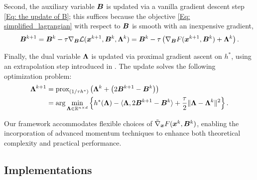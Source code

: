Second, the auxiliary variable $\bm{B}$ is updated via a vanilla gradient descent step \eqref{Eq: the update of B}; this suffices because the objective \eqref{Eq: simplified_lagrangian} with respect to $\bm{B}$ is smooth with an inexpensive gradient, 
\begin{align}
   \bm{B}^{k+1} = \bm{B}^k - \tau \nabla_{\bm{B}}\mathcal{L}(\bm{x}^{k+1}, \bm{B}^k, \bm{\Lambda}^k) = \bm{B}^k - \tau \left( \nabla_{\bm{B}} F(\bm{x}^{k+1}, \bm{B}^k) + \bm{\Lambda}^k \right). \label{Eq: the update of B}
\end{align}

Finally, the dual variable $\bm{\Lambda}$ is updated via proximal gradient ascent on $h^*$, using an extrapolation step introduced in \cite{chambolleFirstOrderPrimalDualAlgorithm2011}. The update solves the following optimization problem:
\begin{align}
    \bm{\Lambda}^{k+1} &= \text{prox}_{(1/\tau h^*)} \left( \bm{\Lambda}^k + \left(2\bm{B}^{k+1} - \bm{B}^k  \right) \right) \notag \\
    &=  \arg\min_{\bm{\Lambda} \in \mathbb{R}^{n\times d} } \left\{ h^*(\bm{\Lambda}) - \langle \bm{\Lambda}, 2\bm{B}^{k+1} - \bm{B}^k \rangle  + \frac{\tau}{2} \| \bm{\Lambda} - \bm{\Lambda}^k\|^2 \right\}. 
    \label{Eq: the update of lambda}
\end{align}

Our framework accommodates flexible choices of $\tilde{\nabla}_{\bm{x}} F(\bm{x}^k, \bm{B}^k)$, enabling the incorporation of advanced momentum techniques to enhance both theoretical complexity and practical performance.
\subsection{Implementations}
\label{Sec: Algorithm implementations}
